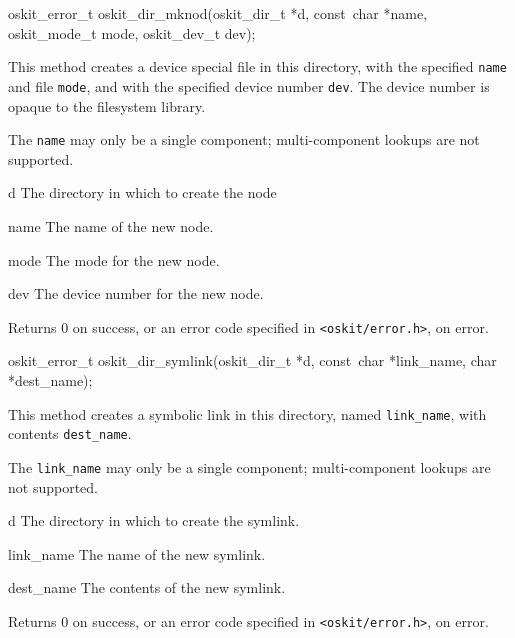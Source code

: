 \begin{apisyn}

	\funcproto oskit_error_t
	oskit_dir_mknod(oskit_dir_t *d, const~char *name,	
		       oskit_mode_t mode, oskit_dev_t dev);	
\end{apisyn}
\ostofs
\begin{apidesc}
	This method creates a device special file in this directory,
	with the specified {\tt name} and file {\tt mode}, 
	and with the specified device number {\tt dev}.  The
	device number is opaque to the filesystem library.

	The {\tt name} may only be a single component; 
	multi-component lookups are not supported.
\end{apidesc}
\begin{apiparm}
	\item[d]
		The directory in which to create the node
	\item[name]
		The name of the new node.
	\item[mode]
		The mode for the new node.
	\item[dev]
		The device number for the new node.
\end{apiparm}
\begin{apiret}
	Returns 0 on success, or an error code specified in
	{\tt <oskit/error.h>}, on error.
\end{apiret}


\begin{apisyn}

	\funcproto oskit_error_t
	oskit_dir_symlink(oskit_dir_t *d, const~char *link_name,	
		         char *dest_name);
\end{apisyn}
\ostofs
\begin{apidesc}
	This method creates a symbolic link in this directory,
	named {\tt link_name}, with contents {\tt dest_name}.

	The {\tt link_name} may only be a single component; 
	multi-component lookups are not supported.
\end{apidesc}
\begin{apiparm}
	\item[d]
		The directory in which to create the symlink.
	\item[link_name]
		The name of the new symlink.
	\item[dest_name]
		The contents of the new symlink.
\end{apiparm}
\begin{apiret}
	Returns 0 on success, or an error code specified in
	{\tt <oskit/error.h>}, on error.
\end{apiret}



